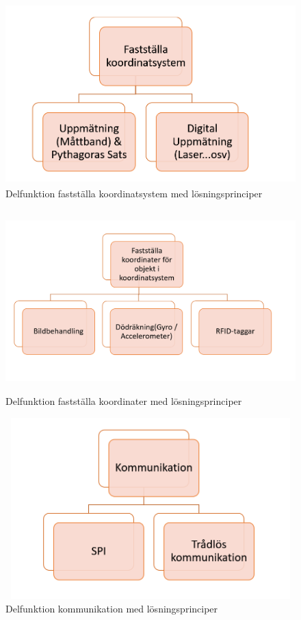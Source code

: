 \documentclass[11pt, a4paper]{report}
\begin{document}
\begin{figure}[H]
	\begin{center}
		\includegraphics [width=12cm, height=7cm, angle=0]{faststallakoordinatsystem.png}
		\caption{Delfunktion fastställa koordinatsystem med lösningsprinciper}
		\label{fig:koordinatsystem}
	\end{center}
\end{figure}

\begin{figure}[H]
	\begin{center}
		\includegraphics [width=12cm, height=7cm, angle=0]{objekt.PNG}
		\caption{Delfunktion fastställa koordinater med lösningsprinciper}
		\label{fig:objekt}
	\end{center}
\end{figure}


\begin{figure}[H]
	\begin{center}
		\includegraphics [width=12cm,height=7cm,angle=0]{kommunikation.png}
		\caption{Delfunktion kommunikation med lösningsprinciper}
		\label{fig:kommunikation}
	\end{center}
\end{figure}
\end{document}
